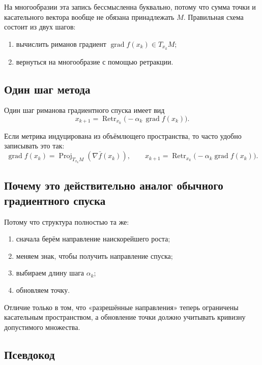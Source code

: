 \documentclass[12pt,a4paper]{article}
\theoremstyle{rudef}
\theoremstyle{ruplain}
\newcommand{\grad}{\operatorname{grad}}
\newcommand{\Proj}{\operatorname{Proj}}
\newcommand{\Retr}{\operatorname{Retr}}
\begin{document}
На многообразии эта запись бессмысленна буквально, потому что сумма точки и касательного вектора вообще не обязана принадлежать $M$. Правильная схема состоит из двух шагов:
\begin{enumerate}
  \item вычислить риманов градиент $\grad f(x_k)\in T_{x_k}M$;
  \item вернуться на многообразие с помощью ретракции.
\end{enumerate}

\subsection{Один шаг метода}

\begin{formulaibox}
Один шаг риманова градиентного спуска имеет вид
\[
\boxed{\ x_{k+1}=\Retr_{x_k}\!\bigl(-\alpha_k\,\grad f(x_k)\bigr).\ }
\]
\end{formulaibox}

Если метрика индуцирована из объёмлющего пространства, то часто удобно записывать это так:
\[
\grad f(x_k)=\Proj_{T_{x_k}M}(\nabla \bar f(x_k)),
\qquad
x_{k+1}=\Retr_{x_k}\!\bigl(-\alpha_k\grad f(x_k)\bigr).
\]

\subsection{Почему это действительно аналог обычного градиентного спуска}

Потому что структура полностью та же:
\begin{enumerate}
  \item сначала берём направление наискорейшего роста;
  \item меняем знак, чтобы получить направление спуска;
  \item выбираем длину шага $\alpha_k$;
  \item обновляем точку.
\end{enumerate}

Отличие только в том, что «разрешённые направления» теперь ограничены касательным пространством, а обновление точки должно учитывать кривизну допустимого множества.

\subsection{Псевдокод}
\end{document}
